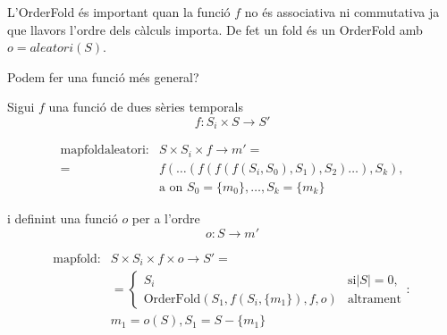 L'OrderFold és important quan la funció $f$ no és associativa ni
commutativa ja que llavors l'ordre dels càlculs importa.  De fet un
fold és un OrderFold amb $o=aleatori(S)$.



Podem fer una funció més general?


Sigui $f$ una funció de dues sèries temporals
\[
f: S_i \times S \longrightarrow S' 
\]

\begin{align*}
  \text{mapfoldaleatori}: & S \times S_i \times f \longrightarrow m'= \\
               =& f(\dots(f(f(f(S_i,S_0),S_1),S_2)\dots),S_k), \\
               & \text{a on } S_0 = \{m_0\}, \dotsc , S_k=\{m_k\} 
\end{align*}

i definint una funció $o$ per a l'ordre
\[
o: S \longrightarrow m' 
\]

\begin{align*}
  \text{mapfold}: & S \times S_i \times f \times o \longrightarrow S'= \\
  &= \begin{cases}
    S_i & \text{si} |S|=0, \\
    \text{OrderFold}(S_1,f(S_i,\{m_1\}),f,o) & \text{altrament}
  \end{cases}:\\
  & m_1 = o(S), S_1 = S - \{m_1\}
\end{align*}





